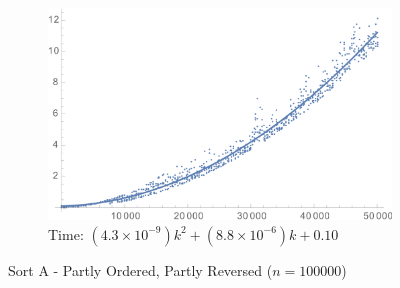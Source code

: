 \documentclass[a4paper]{scrartcl}
\begin{document}
\begin{figure}[p]
    \centering
    \begin{subfigure}[b]{0.45\textwidth}
        \includegraphics[width = \textwidth]{sortA_special_time.png}
        \caption{Time: \((4.3 \times 10^{-9}) k^2 + (8.8 \times 10^{-6}) k + 0.10\)}
    \end{subfigure}
    \caption{Sort A - Partly Ordered, Partly Reversed (\(n = 100000\))}
    \label{fig:sortA_special}
\end{figure}
\end{document}
